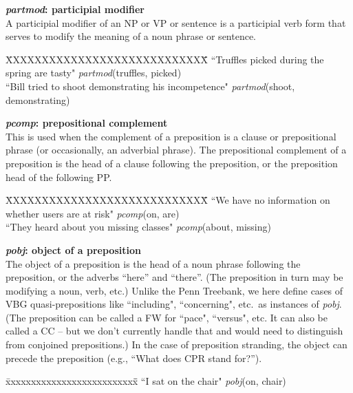 \documentclass[11pt,letter]{article}
\begin{document}
\noindent\textbf{\emph{partmod}: participial modifier}\\
A participial modifier of an NP or VP or sentence is a participial verb form that serves to modify the meaning of a noun phrase or sentence.
\begin{tabbing}
\hspace{1cm} \=XXXXXXXXXXXXXXXXXXXXXXXXXXXX\= \hspace{2cm}\=  \kill
\>  ``Truffles picked during the spring are tasty" \> \> \emph{partmod}(truffles, picked)\\
\>  ``Bill tried to shoot demonstrating his incompetence" \> \> \emph{partmod}(shoot, demonstrating)\\
\end{tabbing}

\noindent\textbf{\emph{pcomp}: prepositional complement}\\
This is used when the complement of a preposition is a clause or
prepositional phrase (or occasionally, an adverbial phrase).
The prepositional complement of a preposition is the head of a clause
following the preposition,
or the preposition head of the following PP.
\begin{tabbing}
\hspace{1cm} \=XXXXXXXXXXXXXXXXXXXXXXXXXXXX\= \hspace{2cm}\=  \kill
\>  ``We have no information on whether users are at risk" \> \> \emph{pcomp}(on, are)\\
\hspace{1cm} \> ``They heard about you missing classes" \> \>  \emph{pcomp}(about, missing)\\
\end{tabbing}

\noindent\textbf{\emph{pobj}: object of a preposition}\\
The object of a preposition is the head of a noun phrase following the preposition, or the adverbs ``here'' and ``there''. (The preposition in turn may be modifying a noun, verb, etc.) Unlike the Penn Treebank, we here define cases of VBG quasi-prepositions like ``including", ``concerning", etc.\ as instances of \emph{pobj}. (The preposition can be called a FW for ``pace", ``versus", etc. It can also be called a CC -- but we don't currently handle that and would need to distinguish from conjoined prepositions.) In the case of preposition stranding, the object can precede the preposition (e.g., ``What does CPR stand for?'').
\begin{tabbing}
\hspace{1cm} \= xxxxxxxxxxxxxxxxxxxxxxxxxx\= \hspace{.5cm}\=  \kill
\>  ``I sat on the chair" \> \> \emph{pobj}(on, chair)\\
\end{tabbing}
\end{document}
